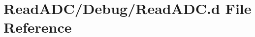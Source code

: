 \hypertarget{_read_a_d_c_8d}{}\section{Read\+A\+D\+C/\+Debug/\+Read\+A\+DC.d File Reference}
\label{_read_a_d_c_8d}
